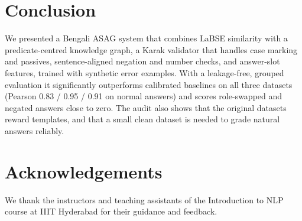 \documentclass[10pt,a4paper,twocolumn]{article}
\begin{document}
\section{Conclusion}
We presented a Bengali ASAG system that combines LaBSE similarity with a
predicate-centred knowledge graph, a Karak validator that handles case
marking and passives, sentence-aligned negation and number checks, and
answer-slot features, trained with synthetic error examples. With a
leakage-free, grouped evaluation it significantly outperforms calibrated
baselines on all three datasets (Pearson 0.83 / 0.95 / 0.91 on normal
answers) and scores role-swapped and negated answers close to zero. The
audit also shows that the original datasets reward templates, and that a
small clean dataset is needed to grade natural answers reliably.

\section*{Acknowledgements}
We thank the instructors and teaching assistants of the Introduction to NLP
course at IIIT Hyderabad for their guidance and feedback.
\end{document}
